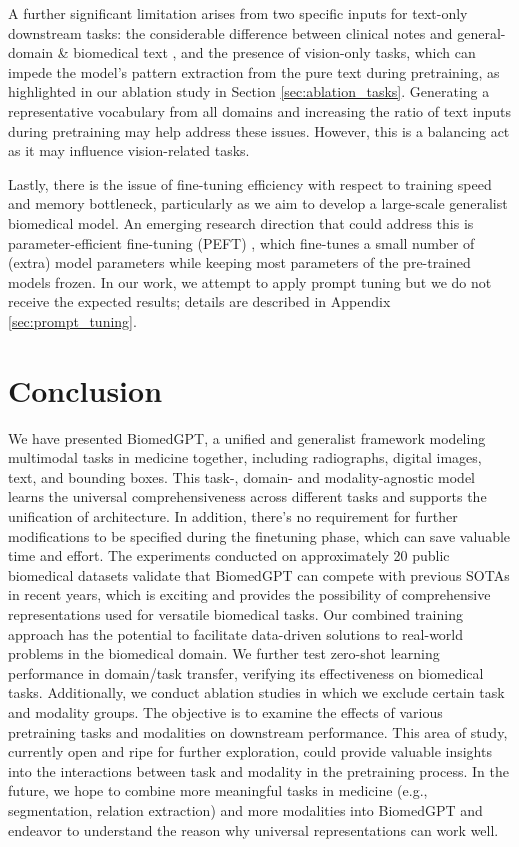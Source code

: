 \documentclass[10pt]{article} \usepackage[preprint]{tmlr}
\begin{document}
A further significant limitation arises from two specific inputs for text-only downstream tasks: the considerable difference between clinical notes and general-domain \& biomedical text \citep{lehman2023we, gu2021domain}, and the presence of vision-only tasks, which can impede the model's pattern extraction from the pure text during pretraining, as highlighted in our ablation study in Section \ref{sec:ablation_tasks}. Generating a representative vocabulary from all domains and increasing the ratio of text inputs during pretraining may help address these issues. However, this is a balancing act as it may influence vision-related tasks. 

Lastly, there is the issue of fine-tuning efficiency with respect to training speed and memory bottleneck, particularly as we aim to develop a large-scale generalist biomedical model. An emerging research direction that could address this is parameter-efficient fine-tuning (PEFT) \citep{ding2023parameter, liu2022few, lialin2023scaling}, which fine-tunes a small number of (extra) model parameters while keeping most parameters of the pre-trained models frozen. In our work, we attempt to apply prompt tuning but we do not receive the expected results; details are described in Appendix \ref{sec:prompt_tuning}.

\section{Conclusion}
We have presented BiomedGPT, a unified and generalist framework modeling multimodal tasks in medicine together, including radiographs, digital images, text, and bounding boxes. This task-, domain- and modality-agnostic model learns the universal comprehensiveness across different tasks and supports the unification of architecture. In addition, there's no requirement for further modifications to be specified during the finetuning phase, which can save valuable time and effort. The experiments conducted on approximately 20 public biomedical datasets validate that BiomedGPT can compete with previous SOTAs in recent years, which is exciting and provides the possibility of comprehensive representations used for versatile biomedical tasks. Our combined training approach has the potential to facilitate data-driven solutions to real-world problems in the biomedical domain. We further test zero-shot learning performance in domain/task transfer, verifying its effectiveness on biomedical tasks. Additionally, we conduct ablation studies in which we exclude certain task and modality groups. The objective is to examine the effects of various pretraining tasks and modalities on downstream performance. This area of study, currently open and ripe for further exploration, could provide valuable insights into the interactions between task and modality in the pretraining process. In the future, we hope to combine more meaningful tasks in medicine (e.g., segmentation, relation extraction) and more modalities into BiomedGPT and endeavor to understand the reason why universal representations can work well.
\end{document}
